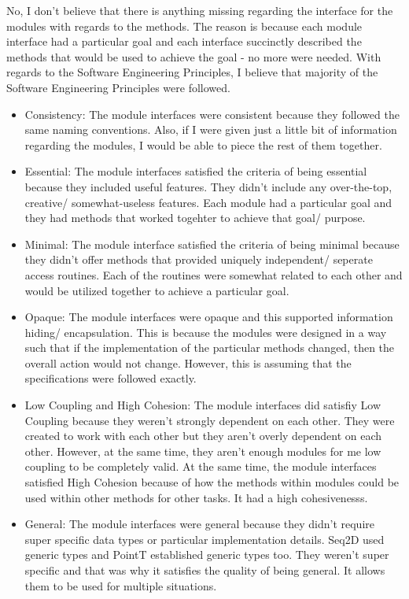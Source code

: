 \documentclass[12pt]{article}
\begin{document}
No, I don't believe that there is anything missing regarding the interface for the modules with regards to the methods.
The reason is because each module interface had a particular goal and each interface succinctly described the methods that would
be used to achieve the goal - no more were needed. With regards to the Software Engineering Principles, I believe that majority of the 
Software Engineering Principles were followed. 
\begin{itemize}
  \item Consistency: The module interfaces were consistent because they followed the same naming conventions.
  Also, if I were given just a little bit of information regarding the modules, I would be able to piece the rest 
  of them together.
  \item Essential: The module interfaces satisfied the criteria of being essential because they included useful features. 
  They didn't include any over-the-top, creative/ somewhat-useless features. Each module had a particular goal and they 
  had methods that worked togehter to achieve that goal/ purpose.
  \item Minimal: The module interface satisfied the criteria of being minimal because they didn't offer methods that provided
  uniquely independent/ seperate access routines. Each of the routines were somewhat related to each other and would be utilized 
  together to achieve a particular goal.
  \item Opaque: The module interfaces were opaque and this supported information hiding/ encapsulation. This is because the modules
  were designed in a way such that if the implementation of the particular methods changed, then the overall action would not change.
  However, this is assuming that the specifications were followed exactly.
  \item Low Coupling and High Cohesion: The module interfaces did satisfiy Low Coupling because they weren't strongly dependent on each other. They were 
  created to work with each other but they aren't overly dependent on each other. However, at the same time, they aren't enough modules for me low coupling to be completely valid.
  At the same time, the module interfaces satisfied High Cohesion because of how the methods within modules could be used within other methods for other tasks. It had a high cohesivenesss.
  \item General: The module interfaces were general because they didn't require super specific data types or particular implementation details.
  Seq2D used generic types and PointT established generic types too. They weren't super specific and that was why it satisfies the quality of being general.
  It allows them to be used for multiple situations.
\end{itemize}
\end{document}

